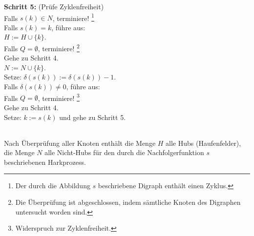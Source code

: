 \begin{algo}
\noindent 
\textbf{Schritt 5:} (Prüfe Zyklenfreiheit)\\
\phantom \quad Falls $s(k) \in N$, terminiere! \footnote{Der durch die Abbildung $s$ beschriebene Digraph enthält einen Zyklus.}\\
\phantom \quad Falls $s(k)=k$, führe aus:\\
\phantom \quad \qquad $H := H \cup \{k\}$.\\
\phantom \quad \qquad Falls $Q = \emptyset$, terminiere! \footnote{Die Überprüfung ist abgeschlossen, indem sämtliche Knoten des Digraphen untersucht worden sind.}\\
\phantom \quad \qquad Gehe zu Schritt 4.\\
\phantom \quad $N:=N \cup \{k\}$.\\
\phantom \quad Setze: $\delta(s(k)):=\delta(s(k))-1$.\\
\phantom \quad Falls $\delta(s(k)) \neq 0$, führe aus:\\
\phantom \quad \qquad Falls $Q=\emptyset$, terminiere! \footnote{Widerspruch zur Zyklenfreiheit.}\\
\phantom \quad \qquad Gehe zu Schritt 4.\\
\phantom \quad Setze: $k:=s(k)$ und gehe zu Schritt 5.
\end{algo}

\phantom \\
\noindent Nach Überprüfung aller Knoten enthält die Menge $H$ alle Hubs (Haufenfelder), die Menge $N$ alle Nicht-Hubs für den durch die Nachfolgerfunktion $s$ beschriebenen Harkprozess.\\


